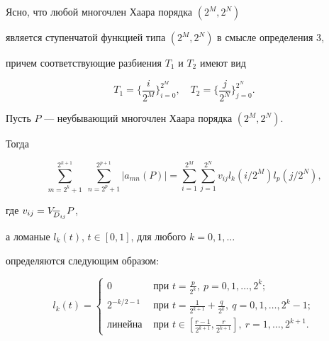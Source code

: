 Ясно, что любой многочлен Хаара порядка $(2^M, 2^N)$


является ступенчатой функцией типа $(2^M, 2^N)$ в смысле определения 3,


причем соответствующие разбиения $T_1$ и $T_2$ имеют вид


$$


T_1=\bigg\{\frac{i}{2^M}\bigg\}_{i=0}^{2^M},\quad


T_2=\bigg\{\frac{j}{2^N}\bigg\}_{j=0}^{2^N}.


$$





\begin{lem}


Пусть $P$ --- неубывающий многочлен Хаара порядка $(2^M, 2^N)$.


Тогда


$$


\sum\limits_{m=2^k+1}^{2^{k+1}}\;\sum\limits_{n=2^p+1}^{2^{p+1}}|a_{mn}(P)|=


\sum\limits_{i=1}^{2^M} \sum\limits_{j=1}^{2^N}


v_{ij} l_k(i/2^M) l_p(j/2^N),


$$


где $v_{ij}=V_{\overline D_{ij}} P$,


а ломаные $l_k(t)$, $t\in[0,1]$, для любого $k=0,1,\dotsc$


определяются следующим образом$:$


$$


l_k(t)=


\begin{cases}


0& \text{ при } t=\frac{p}{2^k},\ p=0,1,\dotsc,2^k;\\


2^{-k/2-1}& \text{ при }


t=\frac{1}{2^{k+1}}+\frac{q}{2^k},\ q=0,1,\dotsc,2^k-1;\\


\text{линейна}& \text{ при }


t \in [\frac{r-1}{2^{k+1}}, \frac{r}{2^{k+1}}],\ r=1,\dotsc,2^{k+1}.


\end{cases}


$$


\end{lem}





